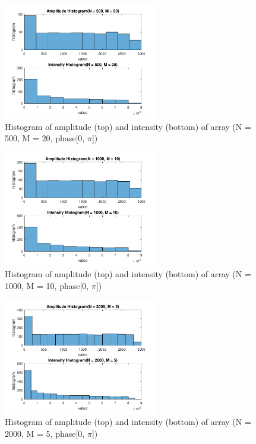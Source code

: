 \documentclass{article}
\begin{document}
\begin{figure}[H]
	\centering
	\includegraphics[width = 0.6\textwidth]{src/pi/hist_500_20.pdf}
	\caption{Histogram of amplitude (top) and intensity (bottom) of array (N = 500, M = 20, phase[0, $\pi$])}
	\label{fig:hist-500-20-pi}
\end{figure}
\begin{figure}[H]
	\centering
	\includegraphics[width = 0.6\textwidth]{src/pi/hist_1000_10.pdf}
	\caption{Histogram of amplitude (top) and intensity (bottom) of array (N = 1000, M = 10, phase[0, $\pi$])}
	\label{fig:hist-1000-10-pi}
\end{figure}
\begin{figure}[H]
	\centering
	\includegraphics[width = 0.6\textwidth]{src/pi/hist_2000_5.pdf}
	\caption{Histogram of amplitude (top) and intensity (bottom) of array (N = 2000, M = 5, phase[0, $\pi$])}
	\label{fig:hist-2000-5-pi}
\end{figure}
\end{document}
